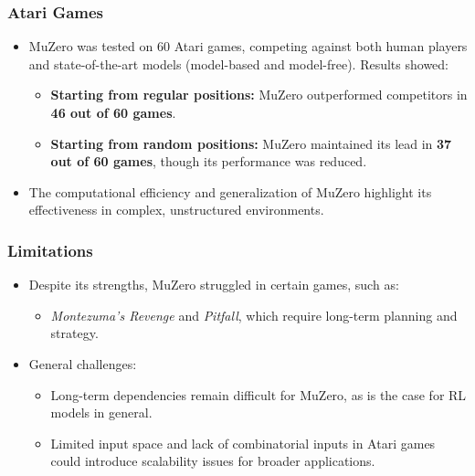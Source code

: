 \subsubsection{Atari Games}
\begin{itemize}
    \item MuZero was tested on 60 Atari games, competing against both human players and
          state-of-the-art models (model-based and model-free). Results showed:
          \begin{itemize}
              \item \textbf{Starting from regular positions:} MuZero outperformed competitors in \textbf{46 out of 60 games}.
              \item \textbf{Starting from random positions:} MuZero maintained its lead in \textbf{37 out of 60 games}, though its performance was reduced.
          \end{itemize}
    \item The computational efficiency and generalization of MuZero highlight its
          effectiveness in complex, unstructured environments.
\end{itemize}

\subsubsection{Limitations}
\begin{itemize}
    \item Despite its strengths, MuZero struggled in certain games, such as:
          \begin{itemize}
              \item \emph{Montezuma's Revenge} and \emph{Pitfall}, which require long-term planning and strategy.
          \end{itemize}
    \item General challenges:
          \begin{itemize}
              \item Long-term dependencies remain difficult for MuZero, as is the case for RL
                    models in general.
              \item Limited input space and lack of combinatorial inputs in Atari games could
                    introduce scalability issues for broader applications.\cite{mz1}
          \end{itemize}
\end{itemize}

